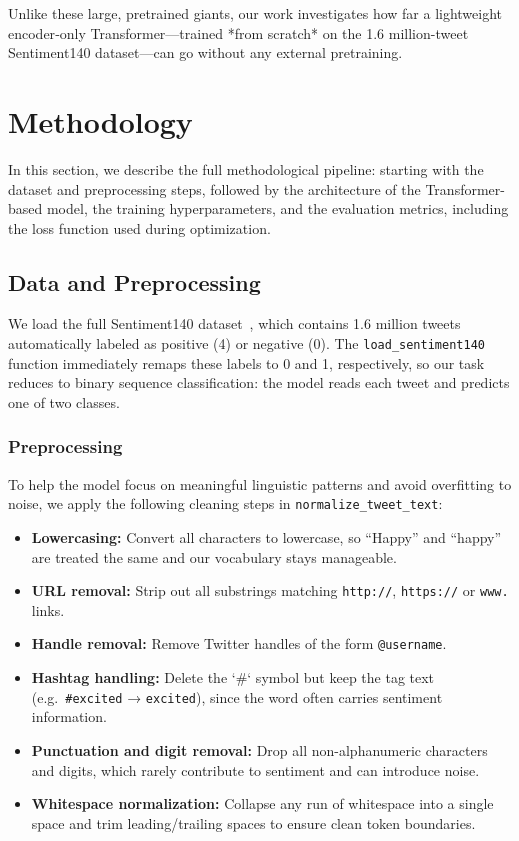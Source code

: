 \documentclass[twocolumn,superscriptaddress,aps]{revtex4-1}
\begin{document}
Unlike these large, pretrained giants, our work investigates how far a lightweight encoder‐only Transformer—trained *from scratch* on the 1.6 million-tweet Sentiment140 dataset—can go without any external pretraining.


\section{Methodology}
\label{section:methodology}
In this section, we describe the full methodological pipeline: starting with the dataset and preprocessing steps, followed by the architecture of the Transformer-based model, the training hyperparameters, and the evaluation metrics, including the loss function used during optimization.

\subsection{Data and Preprocessing}
\label{subsec:data}

We load the full Sentiment140 dataset~\cite{go2009sentiment140}, which contains 1.6 million tweets automatically labeled as positive (4) or negative (0). The \texttt{load\_sentiment140} function immediately remaps these labels to 0 and 1, respectively, so our task reduces to binary sequence classification: the model reads each tweet and predicts one of two classes.

\subsubsection{Preprocessing}
To help the model focus on meaningful linguistic patterns and avoid overfitting to noise, we apply the following cleaning steps in \texttt{normalize\_tweet\_text}:

\begin{itemize}
  \item \textbf{Lowercasing:} Convert all characters to lowercase, so “Happy” and “happy” are treated the same and our vocabulary stays manageable.
  \item \textbf{URL removal:} Strip out all substrings matching \texttt{http://}, \texttt{https://} or \texttt{www.} links.
  \item \textbf{Handle removal:} Remove Twitter handles of the form \texttt{@username}.
  \item \textbf{Hashtag handling:} Delete the `\#` symbol but keep the tag text (e.g.\ \texttt{\#excited} → \texttt{excited}), since the word often carries sentiment information.
  \item \textbf{Punctuation and digit removal:} Drop all non-alphanumeric characters and digits, which rarely contribute to sentiment and can introduce noise.
  \item \textbf{Whitespace normalization:} Collapse any run of whitespace into a single space and trim leading/trailing spaces to ensure clean token boundaries.
\end{itemize}
\end{document}
